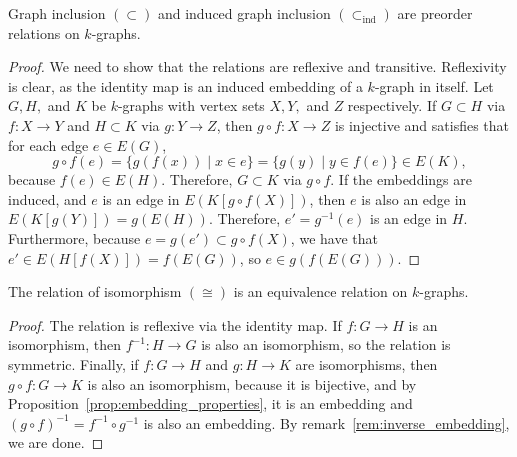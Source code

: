 \begin{proposition}\label{prop:embedding_properties}
    Graph inclusion $(\subset)$ and induced graph inclusion $\left(\subset_{\text{ind}}\right)$
    are preorder relations on $k$-graphs.
    \begin{proof}
        We need to show that the relations are reflexive and transitive.
        Reflexivity is clear, as the identity map is an induced embedding of a $k$-graph in itself.
        Let $G, H,$ and $K$ be $k$-graphs with vertex sets $X, Y,$ and $Z$ respectively.
        If $G \subset H$ via $f: X \to Y$ and $H \subset K$ via $g: Y \to Z$,
        then $g \circ f: X \to Z$ is injective and satisfies that for each edge $e \in E(G)$,
        \[
            g \circ f(e) =
            \{g(f(x))\mid x \in e\} =
            \{g(y) \mid y \in f(e)\} \in E(K),
        \]
        because $f(e) \in E(H)$.
        Therefore, $G \subset K$ via $g \circ f$.
        If the embeddings are induced,
        and $e$ is an edge in
        $E(K[g \circ f(X)])$,
        then $e$ is also an edge in $E(K[g (Y)]) = g(E(H))$.
        Therefore, $e' = g^{-1}(e)$ is an edge in $H$.
        Furthermore, because $e = g(e') \subset g \circ f(X)$,
        we have that $e' \in E(H[f(X)]) = f(E(G))$,
        so $e \in g(f(E(G)))$.
    \end{proof}
\end{proposition}

\begin{proposition}\label{prop:isomorphism_equivalence}
    The relation of isomorphism $(\cong)$ is an equivalence relation on $k$-graphs.
    \begin{proof}
        The relation is reflexive via the identity map.
        If $f: G \to H$ is an isomorphism, then $f^{-1}: H \to G$ is also an isomorphism,
        so the relation is symmetric.
        Finally, if $f: G \to H$ and $g: H \to K$ are isomorphisms,
        then $g \circ f: G \to K$ is also an isomorphism, because it is bijective,
        and by Proposition~\ref{prop:embedding_properties},
        it is an embedding
        and $(g \circ f)^{-1} = f^{-1} \circ g^{-1}$ is also an embedding.
        By remark~\ref{rem:inverse_embedding}, we are done.
    \end{proof}
\end{proposition}

